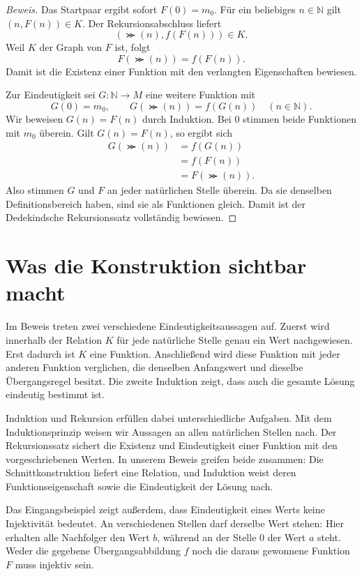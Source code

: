 \begin{proof}[Beweis]
Das Startpaar ergibt sofort \(F(0)=m_0\).
Für ein beliebiges \(n\in\mathbb N\) gilt
\((n,F(n))\in K\). Der Rekursionsabschluss liefert
\[
  (\Succ(n),f(F(n)))\in K.
\]
Weil \(K\) der Graph von \(F\) ist, folgt
\[
  F(\Succ(n))=f(F(n)).
\]
Damit ist die Existenz einer Funktion mit den verlangten
Eigenschaften bewiesen.

Zur Eindeutigkeit sei \(G\colon\mathbb N\to M\) eine weitere
Funktion mit
\[
  G(0)=m_0,
  \qquad
  G(\Succ(n))=f(G(n))
  \quad(n\in\mathbb N).
\]
Wir beweisen \(G(n)=F(n)\) durch Induktion.
Bei \(0\) stimmen beide Funktionen mit \(m_0\) überein.
Gilt \(G(n)=F(n)\), so ergibt sich
\[
  \begin{aligned}
    G(\Succ(n))
      &=f(G(n))\\
      &=f(F(n))\\
      &=F(\Succ(n)).
  \end{aligned}
\]
Also stimmen \(G\) und \(F\) an jeder natürlichen Stelle
überein. Da sie denselben Definitionsbereich haben, sind sie
als Funktionen gleich. Damit ist der Dedekindsche Rekursionssatz
vollständig bewiesen.
\end{proof}

\par{}
\section*{Was die Konstruktion sichtbar macht}

Im Beweis treten zwei verschiedene Eindeutigkeitsaussagen auf.
Zuerst wird innerhalb der Relation \(K\) für jede natürliche
Stelle genau ein Wert nachgewiesen. Erst dadurch ist \(K\)
eine Funktion. Anschließend wird diese Funktion mit jeder anderen
Funktion verglichen, die denselben Anfangswert und dieselbe
Übergangsregel besitzt. Die zweite Induktion zeigt, dass auch
die gesamte Lösung eindeutig bestimmt ist.

Induktion und Rekursion erfüllen dabei unterschiedliche Aufgaben.
Mit dem Induktionsprinzip weisen wir Aussagen an allen natürlichen
Stellen nach. Der Rekursionssatz sichert die Existenz und
Eindeutigkeit einer Funktion mit den vorgeschriebenen Werten.
In unserem Beweis greifen beide zusammen: Die Schnittkonstruktion
liefert eine Relation, und Induktion weist deren Funktionseigenschaft
sowie die Eindeutigkeit der Lösung nach.

Das Eingangsbeispiel zeigt außerdem, dass Eindeutigkeit eines Werts
keine Injektivität bedeutet. An verschiedenen Stellen darf derselbe
Wert stehen: Hier erhalten alle Nachfolger den Wert \(b\),
während an der Stelle \(0\) der Wert \(a\) steht. Weder die
gegebene Übergangsabbildung \(f\) noch die daraus gewonnene
Funktion \(F\) muss injektiv sein.

